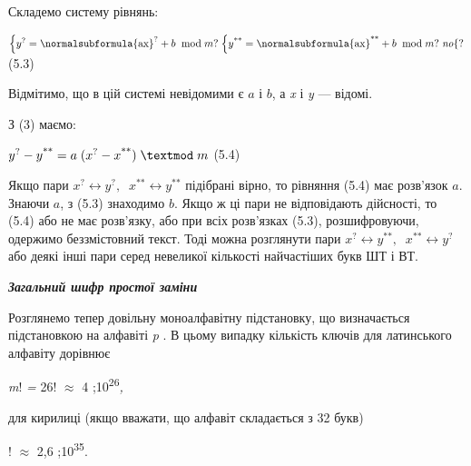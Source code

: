 Складемо систему рівнянь:


\bigskip

{\centering
\textsf{ }
${\begin{matrix}\left\{ y^{?}=\normalsubformula{\text{ax}}^{?}+b\;\;\text{mod}\;m? \right.\left\{ y^{\text{**}}=\normalsubformula{\text{ax}}^{\text{**}}+b\;\;\text{mod}\;m? \right.\mathit{no}\hfill\null
\end{matrix}\{?}$\textsf{  }(5.3)
\par}


\bigskip

Відмітимо, що в цій системі невідомими є  $a$ і   $b$, а 
\textit{x}\textbf{\textit{ }}і\textbf{\textit{ }}\textit{ }\textit{y} --- відомі.

З (3)\textbf{ }маємо:

{\centering
\textsf{ }
$y^{?}-y^{\text{**}}=a\;(x^{?}-x^{\text{**}})\;\textmod\;m$\textsf{
 }(5.4)
\par}


\bigskip

Якщо пари  ${x^{?}\leftrightarrow y^{?},\;\;x^{\text{**}}\leftrightarrow
y^{\text{**}}}$ підібрані  вірно, то рівняння (5.4) має розв’язок  $a$.
Знаючи  $a$, з (5.3) знаходимо  $b$. Якщо ж ці пари не відповідають
дійсності, то (5.4) або не має розв’язку, або при всіх розв’язках (5.3),
розшифровуючи, одержимо беззмістовний текст. Тоді можна розглянути пари 
${x^{?}\leftrightarrow y^{\text{**}},\;\;x^{\text{**}}\leftrightarrow
y^{?}}$ або деякі інші пари серед невеликої кількості найчастіших букв ШТ і
ВТ.


\bigskip


\bigskip

{\centering\bfseries\itshape
Загальний шифр простої заміни
\par}


\bigskip


\bigskip

Розглянемо тепер довільну моноалфавітну підстановку, що визначається
підстановкою  на алфавіті  \textit{\textgreek{p}}\textbf{\textit{ }}. В цьому
випадку кількість ключів для латинського алфавіту дорівнює

{\centering
\textit{m}!\textit{ = }26!\textit{ $\approx$}\textsf{ }4
\textgreek{;}10\textsuperscript{26}\textit{,}
\par}

для кирилиці (якщо вважати, що алфавіт складається з 32 букв)

{! $\approx$ 2,6 \textgreek{;}10\textsuperscript{35}.
\par}

